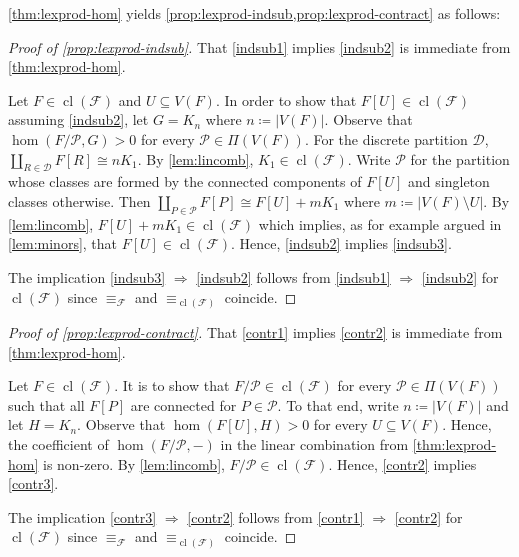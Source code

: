 \documentclass[3p,final]{elsarticle}
\DeclareMathOperator{\cl}{cl}
\begin{document}
	\cref{thm:lexprod-hom} yields \cref{prop:lexprod-indsub,prop:lexprod-contract} as follows: 

	\begin{proof}[Proof of \cref{prop:lexprod-indsub}]
		That \ref{indsub1} implies \ref{indsub2} is immediate from \cref{thm:lexprod-hom}.
		
		Let $F \in \cl(\mathcal{F})$ and $U \subseteq V(F)$. In order to show that $F[U] \in \cl(\mathcal{F})$ assuming \ref{indsub2}, let $G = K_n$ where $n \coloneqq |V(F)|$.
		Observe that $\hom(F/\mathcal{P}, G) > 0$ for every $\mathcal{P} \in \Pi(V(F))$. For the discrete partition $\mathcal{D}$, $\coprod_{R \in \mathcal{D}} F[R] \cong nK_1$. By \cref{lem:lincomb}, $K_1 \in \cl(\mathcal{F})$. 
		Write $\mathcal{P}$ for the partition whose classes are formed by the connected components of $F[U]$ and singleton classes otherwise. Then $\coprod_{P \in \mathcal{P}} F[P] \cong F[U] + m K_1$ where $m \coloneqq |V(F) \setminus U|$. By \cref{lem:lincomb}, $F[U] + mK_1 \in \cl(\mathcal{F})$ which implies, as for example argued in \cref{lem:minors}, that $F[U] \in \cl(\mathcal{F})$.
		Hence, \ref{indsub2} implies \ref{indsub3}.
		
		The implication \ref{indsub3} $\Rightarrow$ \ref{indsub2} follows from \ref{indsub1} $\Rightarrow$ \ref{indsub2} for $\cl(\mathcal{F})$ since $\equiv_{\mathcal{F}}$ and $\equiv_{\cl(\mathcal{F})}$ coincide.
	\end{proof}
	
	\begin{proof}[Proof of \cref{prop:lexprod-contract}]
		That \ref{contr1} implies \ref{contr2} is immediate from \cref{thm:lexprod-hom}.
		
		Let $F \in \cl(\mathcal{F})$. It is to show that $F/\mathcal{P} \in \cl(\mathcal{F})$ for every $\mathcal{P} \in \Pi(V(F))$ such that all $F[P]$ are connected for $P \in \mathcal{P}$.
		To that end, write $n \coloneqq |V(F)|$ and let $H = K_n$.
		Observe that $\hom(F[U], H) > 0$ for every $U \subseteq V(F)$.
		Hence, the coefficient of $\hom(F/\mathcal{P}, -)$ in the linear combination from \cref{thm:lexprod-hom} is non-zero. By \cref{lem:lincomb}, $F/\mathcal{P} \in \cl(\mathcal{F})$.
		Hence, \ref{contr2} implies \ref{contr3}.
		
		The implication \ref{contr3} $\Rightarrow$ \ref{contr2} follows from \ref{contr1} $\Rightarrow$ \ref{contr2} for $\cl(\mathcal{F})$ since $\equiv_{\mathcal{F}}$ and $\equiv_{\cl(\mathcal{F})}$ coincide.
	\end{proof}
	
\end{document}
